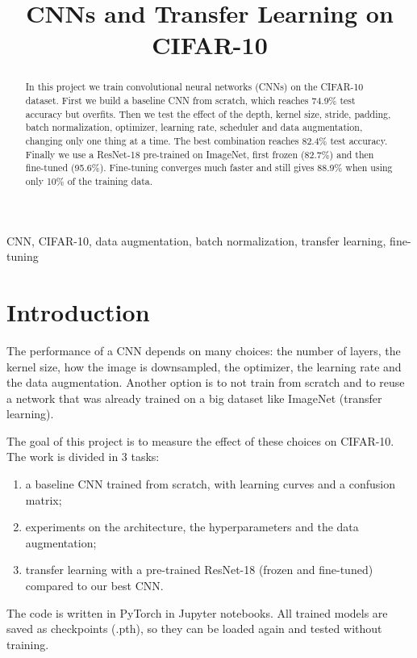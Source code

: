 \documentclass[conference]{IEEEtran}
\begin{document}
\title{CNNs and Transfer Learning on CIFAR-10}

\author{
}

\maketitle

\begin{abstract}
In this project we train convolutional neural networks (CNNs) on the CIFAR-10 dataset. First we build a baseline CNN
from scratch, which reaches 74.9\% test accuracy but overfits. Then we test the effect of the depth, kernel size,
stride, padding, batch normalization, optimizer, learning rate, scheduler and data augmentation, changing only one
thing at a time. The best combination reaches 82.4\% test accuracy. Finally we use a ResNet-18 pre-trained on ImageNet,
first frozen (82.7\%) and then fine-tuned (95.6\%). Fine-tuning converges much faster and still gives 88.9\% when
using only 10\% of the training data.
\end{abstract}

\begin{IEEEkeywords}
CNN, CIFAR-10, data augmentation, batch normalization, transfer learning, fine-tuning
\end{IEEEkeywords}

\section{Introduction}
The performance of a CNN depends on many choices: the number of layers, the kernel size, how the image is
downsampled, the optimizer, the learning rate and the data augmentation. Another option is to not train from scratch
and to reuse a network that was already trained on a big dataset like ImageNet (transfer learning).

The goal of this project is to measure the effect of these choices on CIFAR-10. The work is divided in 3 tasks:
\begin{enumerate}
\item a baseline CNN trained from scratch, with learning curves and a confusion matrix;
\item experiments on the architecture, the hyperparameters and the data augmentation;
\item transfer learning with a pre-trained ResNet-18 (frozen and fine-tuned) compared to our best CNN.
\end{enumerate}
The code is written in PyTorch in Jupyter notebooks. All trained models are saved as checkpoints (.pth), so they can be
loaded again and tested without training.
\end{document}
